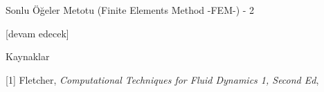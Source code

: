 \documentclass[12pt,fleqn]{article}\usepackage{../../common}
\begin{document}
Sonlu Öğeler Metotu (Finite Elements Method -FEM-) - 2







[devam edecek]

Kaynaklar

[1] Fletcher, {\em Computational Techniques for Fluid Dynamics 1, Second Ed}, 
\end{document}
